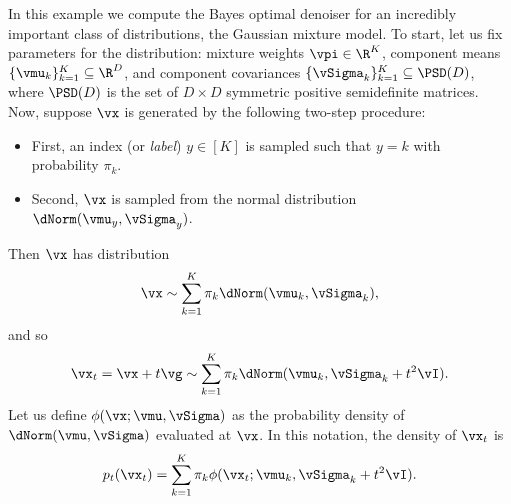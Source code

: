 \documentclass[../../book-main.tex]{subfiles}
\begin{document}
\begin{example}\label{example:denoising_gaussian_mixture}
	In this example we compute the Bayes optimal denoiser for an incredibly important class of distributions, the Gaussian mixture model. To start, let us fix parameters for the distribution: mixture weights \(\vpi \in \R^{K}\), component means \(\{\vmu_{k}\}_{k = 1}^{K} \subseteq \R^{D}\), and component covariances \(\{\vSigma_{k}\}_{k = 1}^{K} \subseteq \PSD(D)\), where  \(\PSD(D)\) is the set of \(D \times D\) symmetric positive semidefinite matrices. Now, suppose \(\vx\) is generated by the following two-step procedure:
	\begin{itemize}
		\item First, an index (or \textit{label}) \(y \in [K]\) is sampled such that \(y = k\) with probability \(\pi_{k}\).
		\item Second, \(\vx\) is sampled from the normal distribution \(\dNorm(\vmu_{y}, \vSigma_{y})\).
	\end{itemize}
	Then \(\vx\) has distribution
	\begin{equation}
		\vx \sim \sum_{k = 1}^{K}\pi_{k}\dNorm(\vmu_{k}, \vSigma_{k}),
	\end{equation}
	and so 
	\begin{equation}
		\vx_{t} = \vx + t\vg \sim \sum_{k = 1}^{K}\pi_{k}\dNorm(\vmu_{k}, \vSigma_{k} + t^{2}\vI).
	\end{equation}
	Let us define \(\phi(\vx ; \vmu, \vSigma)\) as the probability density of \(\dNorm(\vmu, \vSigma)\) evaluated at \(\vx\). In this notation, the density of \(\vx_{t}\) is 
	\begin{equation}
		p_{t}(\vx_{t}) = \sum_{k = 1}^{K}\pi_{k}\phi(\vx_{t} ; \vmu_{k}, \vSigma_{k} + t^{2}\vI).
	\end{equation}


\end{example}
\end{document}
